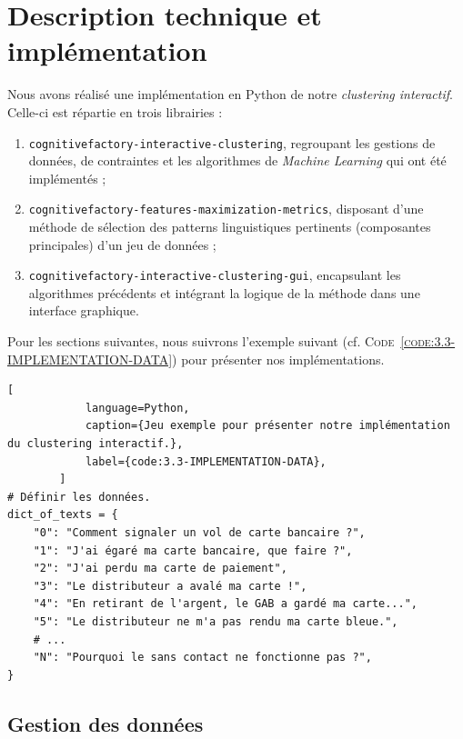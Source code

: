 		
    \section{Description technique et implémentation}
	\label{section:3.3-DESCRIPTION-IMPLEMENTATION}
		
		Nous avons réalisé une implémentation en Python de notre \textit{clustering interactif}. Celle-ci est répartie en trois librairies :
		\begin{enumerate}
			\item \texttt{cognitivefactory-interactive-clustering}, regroupant les gestions de données, de contraintes et les algorithmes de \textit{Machine Learning} qui ont été implémentés ;
			\item \texttt{cognitivefactory-features-maximization-metrics}, disposant d'une méthode de sélection des patterns linguistiques pertinents (composantes principales) d'un jeu de données ;
			\item \texttt{cognitivefactory-interactive-clustering-gui}, encapsulant les algorithmes précédents et intégrant la logique de la méthode dans une interface graphique.
		\end{enumerate}
		
		Pour les sections suivantes, nous suivrons l'exemple suivant (cf. \textsc{Code~\ref{code:3.3-IMPLEMENTATION-DATA}}) pour présenter nos implémentations.
		
		\begin{lstlisting}[
			language=Python,
			caption={Jeu exemple pour présenter notre implémentation du clustering interactif.},
			label={code:3.3-IMPLEMENTATION-DATA},
		]
# Définir les données.
dict_of_texts = {
    "0": "Comment signaler un vol de carte bancaire ?",
    "1": "J'ai égaré ma carte bancaire, que faire ?",
    "2": "J'ai perdu ma carte de paiement",
    "3": "Le distributeur a avalé ma carte !",
    "4": "En retirant de l'argent, le GAB a gardé ma carte...",
    "5": "Le distributeur ne m'a pas rendu ma carte bleue.",
    # ...
    "N": "Pourquoi le sans contact ne fonctionne pas ?",
}
		\end{lstlisting}
		
		
		\subsection{Gestion des données}
		\label{section:3.3.1-GESTION-DES-DONNEES}
				
